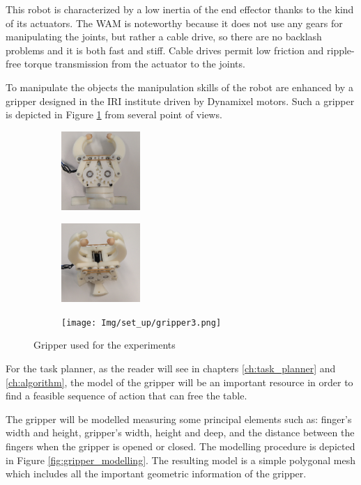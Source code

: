 This robot is characterized by a low inertia of the end effector thanks to the kind of its actuators. The WAM is noteworthy because it does not use any gears for manipulating the joints, but rather a cable drive, so there are no backlash problems and it is both fast and stiff. Cable drives permit low friction and ripple-free torque transmission from the actuator to the joints. 




To manipulate the objects the manipulation skills of the robot are enhanced by a gripper designed in the IRI institute driven by Dynamixel motors. Such a gripper is depicted in Figure \ref{fig:gripper_general} from several point of views. 

\begin{figure}[htp]
\centering
\begin{subfigure}[b]{0.3\textwidth}
\centering
\includegraphics[height=3cm]{Img/set_up/gripper1.png}
\end{subfigure}
\begin{subfigure}[b]{0.3\textwidth}
\centering
\includegraphics[height=3cm]{Img/set_up/gripper2.png}
\end{subfigure}
\begin{subfigure}[b]{0.3\textwidth}
\centering
\texttt{[image: Img/set\_up/gripper3.png]}
\end{subfigure}
\caption{Gripper used for the experiments}\label{fig:gripper_general}
\end{figure}

For the task planner, as the reader will see in chapters \ref{ch:task_planner} and \ref{ch:algorithm}, the model of the gripper will be an important resource 
in order to find a feasible sequence of action that can free the table.

The gripper will be modelled measuring some principal elements such as: finger's width and height, gripper's width, height and deep, and the distance between the fingers when the gripper is opened or closed. The modelling procedure is depicted in Figure \ref{fig:gripper_modelling}. The resulting model is a simple polygonal mesh which includes all the important geometric information of the gripper.


